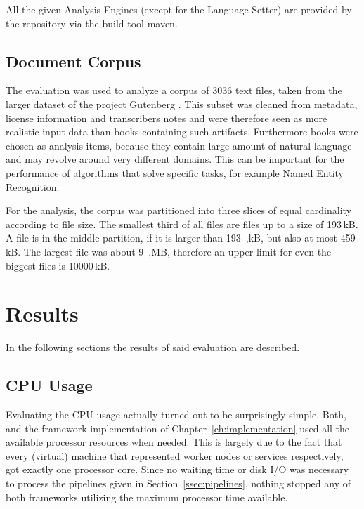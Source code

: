 \begin{itemize}
\begin{enumerate}
	\end{enumerate}
	
\end{itemize}
All the given Analysis Engines (except for the Language Setter) are provided by the \dkpro{} repository via the build tool maven. 

\subsection{Document Corpus}
The evaluation was used to analyze a corpus of 3036 text files, taken from the larger dataset of the project Gutenberg \cite{lahiri:2014:SRW}. This subset was cleaned from metadata, license information and transcribers notes and were therefore seen as more realistic input data than books containing such artifacts. Furthermore books were chosen as analysis items, because they contain large amount of natural language and may revolve around very different domains. This can be important for the performance of algorithms that solve specific \nlp{} tasks, for example Named Entity Recognition. 

For the analysis, the corpus was partitioned into three slices of equal cardinality according to file size. The smallest third of all files are files up to a size of 193\,kB. A file is in the middle partition, if it is larger than 193~,kB, but also at most 459\,kB. The largest file was about 9~,MB, therefore an upper limit for even the biggest files is 10000\,kB.
\section{Results}

In the following sections the results of said evaluation are described.

\subsection{CPU Usage}
Evaluating the CPU usage actually turned out to be surprisingly simple. Both, \uimaas{} and the framework implementation of Chapter~\ref{ch:implementation} used all the available processor resources when needed. This is largely due to the fact that every (virtual) machine that represented worker nodes or services respectively, got exactly one processor core. Since no waiting time or disk I/O was necessary to process the pipelines given in Section~\ref{ssec:pipelines}, nothing stopped any of both frameworks utilizing the maximum processor time available.

